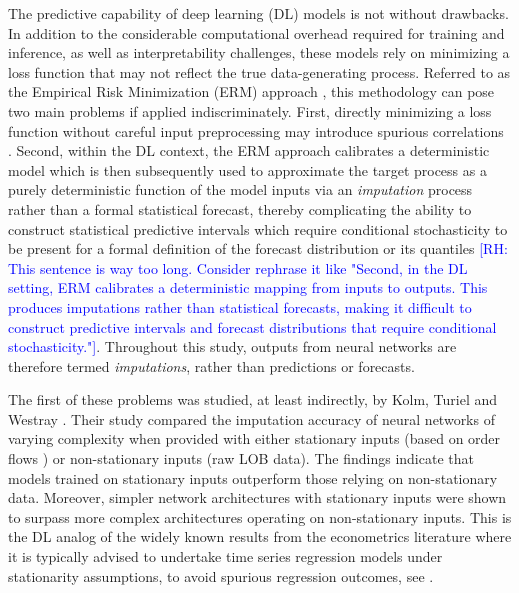\documentclass[10pt,a4paper,oneside]{article}
\newcommand{\rh}[1]{\textcolor{blue}{\textsf{[RH: #1]}}}
\begin{document}
The predictive capability of deep learning (DL) models is not without drawbacks. In addition to the considerable computational overhead required for training and inference, as well as interpretability challenges, these models rely on minimizing a loss function that may not reflect the true data-generating process. Referred to as the Empirical Risk Minimization (ERM) approach \cite{breiman2001statistical}, this methodology can pose two main problems if applied indiscriminately. First, directly minimizing a loss function without careful input preprocessing may introduce spurious correlations \cite{granger1974spurious, phillips1986understanding}. Second, within the DL context, the ERM approach calibrates a deterministic model which is then subsequently used to approximate the target process as a purely deterministic function of the model inputs via an \emph{imputation} process rather than a formal statistical forecast, thereby complicating the ability to construct statistical predictive intervals which require conditional stochasticity to be present for a formal definition of the forecast distribution or its quantiles \rh{This sentence is way too long. Consider rephrase it like "Second, in the DL setting, ERM calibrates a deterministic mapping from inputs to outputs. This produces imputations rather than statistical forecasts, making it difficult to construct predictive intervals and forecast distributions that require conditional stochasticity."}. Throughout this study, outputs from neural networks are therefore termed \emph{imputations}, rather than predictions or forecasts.

The first of these problems was studied, at least indirectly, by Kolm, Turiel and Westray \cite{kolm2023deep}. Their study compared the imputation accuracy of neural networks of varying complexity when provided with either stationary inputs (based on order flows \cite{cont2013price}) or non-stationary inputs (raw LOB data). The findings indicate that models trained on stationary inputs outperform those relying on non-stationary data. Moreover, simpler network architectures with stationary inputs were shown to surpass more complex architectures operating on non-stationary inputs. This is the DL analog of the widely known results from the econometrics literature where it is typically advised to undertake time series regression models under stationarity assumptions, to avoid spurious regression outcomes, see \cite{granger1974spurious, phillips1986understanding, hamilton_time_1994}.
\end{document}
